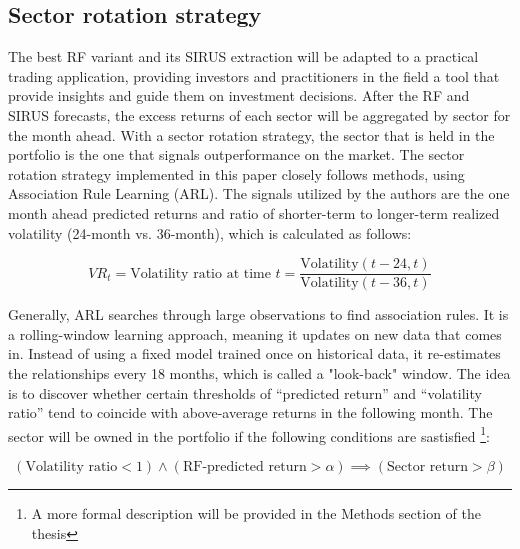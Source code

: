 \subsection{Sector rotation strategy}
The best RF variant and its SIRUS extraction will be adapted to a practical trading application, providing investors and practitioners in the field a tool that provide insights and guide them on investment decisions. After the RF and SIRUS forecasts, the excess returns of each sector will be aggregated by sector for the month ahead. With a sector rotation strategy, the sector that is held in the portfolio is the one that signals outperformance on the market. The sector rotation strategy implemented in this paper closely follows  methods, using Association Rule Learning (ARL). The signals utilized by the authors are the one month ahead predicted returns and ratio of shorter-term to longer-term realized volatility (24-month vs. 36-month), which is calculated as follows:

\begin{equation}
    \label{eq:vol_ratio}
    VR_t = \text{Volatility ratio at time } t = \frac{\text{Volatility}(t-24, t)}{\text{Volatility}(t-36, t)}
\end{equation}
    

Generally, ARL searches through large observations to find association rules. It is a rolling-window learning approach, meaning it updates on new data that comes in. Instead of using a fixed model trained once on historical data, it re-estimates the relationships every 18 months, which is called a "look-back" window.  The idea is to discover whether certain thresholds of “predicted return” and “volatility ratio” tend to coincide with above-average returns in the following month. The sector will be owned in the portfolio if the following conditions are sastisfied \footnote{A more formal description will be provided in the Methods section of the thesis}:

\begin{equation}
    \label{eq:arl}
    (\text{Volatility ratio} < 1) \land (\text{RF-predicted return} > \alpha) \implies (\text{Sector return} > \beta)
\end{equation}
    


